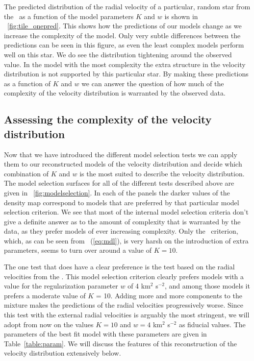 The predicted distribution of the radial velocity of a particular,
random star from the \gcsabb\ as a function of the model parameters
$K$ and $w$ is shown in \figurename~\ref{fig:tile_onepred}. This shows
how the predictions of our models change as we increase the complexity
of the model. Only very subtle differences between the predictions can
be seen in this figure, as even the least complex models perform well
on this star. We do see the distribution tightening around the
observed value. In the model with the most complexity the extra
structure in the velocity distribution is not supported by this
particular star. By making these predictions as a function of $K$ and
$w$ we can answer the question of how much of the complexity of the
velocity distribution is warranted by the observed data.


\subsection{Assessing the complexity of the velocity distribution}\label{sec:complexity}

Now that we have introduced the different model selection tests we can
apply them to our reconstructed models of the velocity distribution
and decide which combination of $K$ and $w$ is the most suited to
describe the velocity distribution. The model selection surfaces for
all of the different tests described above are given in
\figurename~\ref{fig:modelselection}. In each of the panels the darker
values of the density map correspond to models that are preferred by
that particular model selection criterion. We see that most of the
internal model selection criteria don't give a definite answer as to
the amount of complexity that is warranted by the data, as they prefer
models of ever increasing complexity. Only the \MDL\ criterion, which,
as can be seen from \eqnname~(\ref{eq:mdl}), is very harsh on the
introduction of extra parameters, seems to turn over around a value of
$K = 10$.

The one test that does have a clear preference is the test based on
the radial velocities from the \gcsabb. This model selection criterion
clearly prefers models with a value for the regularization parameter
$w$ of 4 km$^2$ s$^{-2}$, and among those models it prefers a moderate
value of $K$ = 10. Adding more and more components to the mixture
makes the predictions of the radial velocities progressively
worse. Since this test with the external radial velocities is arguably
the most stringent, we will adopt from now on the values $K = 10$ and
$w = 4$ km$^{2}$ s$^{-2}$ as fiducial values. The parameters of the
best fit model with these parameters are given in
Table~\ref{table:param}. We will discuss the features of this
reconstruction of the velocity distribution extensively below.

